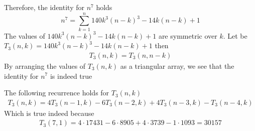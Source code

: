 Therefore, the identity for $n^7$ holds
\begin{equation*}
    n^7 = \sum_{k=1}^{n} 140 k^3 (n-k)^3 - 14k(n-k) + 1
\end{equation*}
The values of $140 k^3 (n-k)^3 - 14k(n-k) + 1$ are symmetric over $k$.
Let be $T_3 (n,k) = 140 k^3 (n-k)^3 - 14k(n-k) + 1$ then
\begin{align*}
    T_3 (n,k) = T_3 (n, n-k)
\end{align*}
By arranging the values of $T_{3} (n,k)$ as a triangular array, we see that the identity for $n^7$ is indeed true

The following recurrence holds for $T_{3} (n,k)$
\begin{align*}
    T_{3} (n, k) = 4T_{3} (n-1, k) - 6T_{3} (n-2, k) + 4T_{3} (n-3, k) - T_{3} (n-4, k)
\end{align*}
Which is true indeed because
\begin{align*}
    T_{3} (7, 1) = 4 \cdot 17431 -6 \cdot 8905 + 4 \cdot 3739 - 1 \cdot 1093 = 30157
\end{align*}
